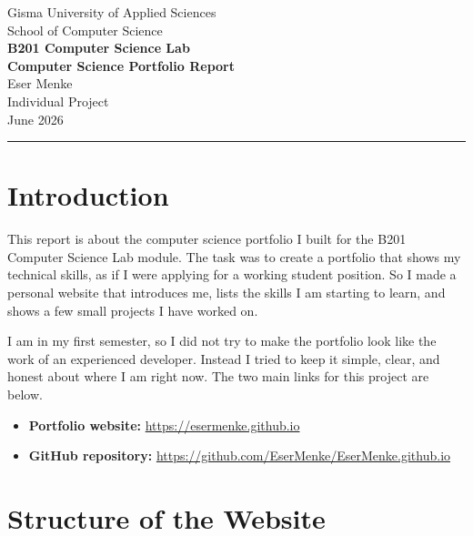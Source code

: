 \documentclass[11pt,a4paper]{article}
\begin{document}
\begin{center}
  {\large Gisma University of Applied Sciences}\\[2pt]
  {\normalsize School of Computer Science}\\[14pt]
  {\Large\bfseries\color{accent} B201 Computer Science Lab}\\[6pt]
  {\Large\bfseries Computer Science Portfolio Report}\\[14pt]
  {\normalsize Eser Menke}\\[2pt]
  {\small Individual Project}\\[2pt]
  {\small June 2026}
\end{center}

\vspace{10pt}
\hrule
\vspace{14pt}

\section{Introduction}

This report is about the computer science portfolio I built for the B201 Computer Science
Lab module. The task was to create a portfolio that shows my technical skills, as if I were
applying for a working student position. So I made a personal website that introduces me,
lists the skills I am starting to learn, and shows a few small projects I have worked on.

I am in my first semester, so I did not try to make the portfolio look like the work of an
experienced developer. Instead I tried to keep it simple, clear, and honest about where I am
right now. The two main links for this project are below.

\begin{itemize}[leftmargin=1.4em, itemsep=2pt, topsep=2pt]
  \item \textbf{Portfolio website:} \url{https://esermenke.github.io}
  \item \textbf{GitHub repository:} \url{https://github.com/EserMenke/EserMenke.github.io}
\end{itemize}

\section{Structure of the Website}
\end{document}
